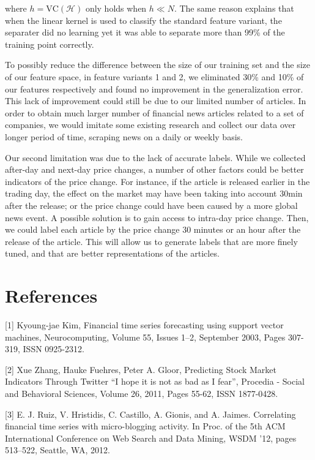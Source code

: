 \documentclass{article}
\begin{document}
where $h=\text{VC}(\mathcal{H})$ only holds when $h\ll N$. The same reason explains that when the linear kernel is used to classify the standard feature variant, the separater did no learning yet it was able to separate more than 99\% of the training point correctly. 

To possibly reduce the difference between the size of our training set and the size of our feature space, in feature variants 1 and 2, we eliminated 30\% and 10\% of our features respectively and found no improvement in the generalization error. This lack of improvement could still be due to our limited number of articles. In order to obtain much larger number of financial news articles related to a set of companies, we would imitate some existing research and collect our data over longer period of time, scraping news on a daily or weekly basis. 

Our second limitation was due to the lack of accurate labels. While we collected after-day and next-day price changes, a number of other factors could be better indicators of the price change. For instance, if the article is released earlier in the trading day, the effect on the market may have been taking into account 30min after the release; or the price change could have been caused by a more global news event. A possible solution is to gain access to intra-day price change. Then, we could label each article by the price change 30 minutes or an hour after the release of the article. This will allow us to generate labels that are more finely tuned, and that are better representations of the articles. 


\section{References}

[1] Kyoung-jae Kim, Financial time series forecasting using support vector machines, Neurocomputing, Volume 55, Issues 1–2, September 2003, Pages 307-319, ISSN 0925-2312.

[2] Xue Zhang, Hauke Fuehres, Peter A. Gloor, Predicting Stock Market Indicators Through Twitter “I hope it is not as bad as I fear”, Procedia - Social and Behavioral Sciences, Volume 26, 2011, Pages 55-62, ISSN 1877-0428.

[3] E. J. Ruiz, V. Hristidis, C. Castillo, A. Gionis, and A. Jaimes.
Correlating ﬁnancial time series with micro-blogging
activity. In Proc. of the 5th ACM International Conference
on Web Search and Data Mining, WSDM ’12, pages
513–522, Seattle, WA, 2012.
\end{document}
